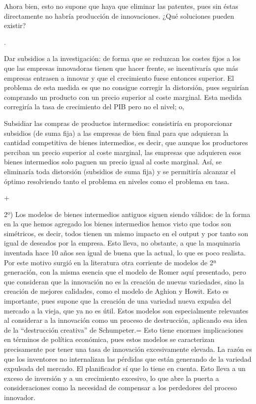 \documentclass[10pt,a4paper]{article}
\newcounter{numitem}
\newenvironment{lnum}
      {\begin{list}{\arabic{numitem}.}{%
          \usecounter{numitem}%
          \setlength{\leftmargin}{1cm}%
          \setlength{\parskip}{3pt}%
          \setlength{\itemsep}{0pt}%
          \setlength{\parsep}{0pt}%
      }}
      {\end{list}}
\begin{document}
Ahora bien, esto no supone que haya que eliminar las patentes, pues sin éstas directamente no habría producción de innovaciones. ¿Qué soluciones pueden existir?
\begin{lnum}
    \item Dar subsidios a la investigación: de forma que se reduzcan los costes fijos a los que las empresas innovadoras tienen que hacer frente, se incentivaría que más empresas entrasen a innovar y que el crecimiento fuese entonces superior. El problema de esta medida es que no consigue corregir la distorsión, pues seguirían comprando un producto con un precio superior al coste marginal. Esta medida corregiría la tasa de crecimiento del PIB pero no el nivel; o,
    \item Subsidiar las compras de productos intermedios: consistiría en proporcionar subsidios (de suma fija) a las empresas de bien final para que adquieran la cantidad competitiva de bienes intermedios, es decir, que aunque los productores perciban un precio superior al coste marginal, las empresas que adquieren esos bienes intermedios solo paguen un precio igual al coste marginal. Así, se eliminaría toda distorsión (subsidios de suma fija) y se permitiría alcanzar el óptimo resolviendo tanto el problema en niveles como el problema en tasa. 
\end{lnum}
+ 
 
2º) Los modelos de bienes intermedios antiguos siguen siendo válidos: de la forma en la que hemos agregado los bienes intermedios hemos visto que todos son simétricos, es decir, todos tienen un mismo impacto en el output y por tanto son igual de deseados por la empresa. Esto lleva, no obstante, a que la maquinaria inventada hace 10 años sea igual de buena que la actual, lo que es poco realista.
Por este motivo surgió en la literatura otra corriente de modelos de 2ª generación, con la misma esencia que el modelo de Romer aquí presentado, pero que consideran que la innovación no es la creación de nuevas variedades, sino la creación de mejores calidades, como el modelo de Aghion y Howit. Esto es importante, pues supone que la creación de una variedad nueva expulsa del mercado a la vieja, que ya no es útil. Estos modelos son especialmente relevantes al considerar a la innovación como un proceso de destrucción, aplicando esa idea de la “destrucción creativa” de Schumpeter.= Esto tiene enormes implicaciones en términos de política económica, pues estos modelos se caracterizan precisamente por tener una tasa de innovación excesivamente elevada.
La razón es que los inventores no internalizan las pérdidas que están generando de la variedad expulsada del mercado. El planificador sí que lo tiene en cuenta. Esto lleva a un exceso de inversión y a un crecimiento excesivo, lo que abre la puerta a consideraciones como la necesidad de compensar a los perdedores del proceso innovador. 
\end{document}
